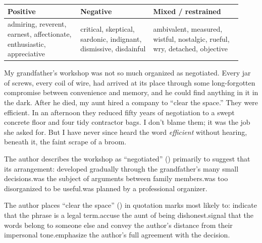 \documentclass[11pt]{article}
\begin{document}
\begin{center}
\small
\begin{tabular}{@{}p{0.29\linewidth}p{0.29\linewidth}p{0.34\linewidth}@{}}
\toprule
\textbf{Positive} & \textbf{Negative} & \textbf{Mixed / restrained}\\
\midrule
admiring, reverent, earnest, affectionate, enthusiastic, appreciative & critical, skeptical, sardonic, indignant, dismissive, disdainful & ambivalent, measured, wistful, nostalgic, rueful, wry, detached, objective\\
\bottomrule
\end{tabular}
\end{center}

\begin{passage}
My grandfather's workshop was not so much organized as negotiated. Every jar of screws, every coil of wire, had arrived at its place through some long-forgotten compromise between convenience and memory, and he could find anything in it in the dark. After he died, my aunt hired a company to ``clear the space.'' They were efficient. In an afternoon they reduced fifty years of negotiation to a swept concrete floor and four tidy contractor bags. I don't blame them; it was the job she asked for. But I have never since heard the word \emph{efficient} without hearing, beneath it, the faint scrape of a broom.
\end{passage}

{The author describes the workshop as ``negotiated'' () primarily to suggest that its arrangement:}
{developed gradually through the grandfather's many small decisions.}{was the subject of arguments between family members.}{was too disorganized to be useful.}{was planned by a professional organizer.}

{The author places ``clear the space'' () in quotation marks most likely to:}
{indicate that the phrase is a legal term.}{accuse the aunt of being dishonest.}{signal that the words belong to someone else and convey the author's distance from their impersonal tone.}{emphasize the author's full agreement with the decision.}
\end{document}
